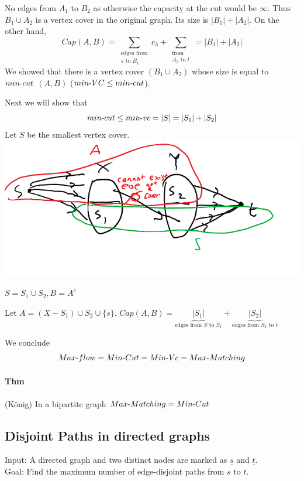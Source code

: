 \documentclass[12 pt]{article}
\begin{document}
        No edges from $A_1$ to $B_2$ as otherwise the capacity at the
        cut would be $\infty$. Thus $B_1 \cup A_2$ is a vertex cover
        in the original graph. Its size is $|B_1|+|A_2|$. On the other
        hand,
        $$Cap(A,B) = \sum_{\substack{\text{edges from} \\ s\text{ to }B_1}} c_3
        + \sum_{\substack{\text{from} \\ A_2\text{ to }t}} = |B_1| + |A_2|$$
        We showed that there is a vertex cover $(B_1 \cup A_2)$ whose
        size is equal to $min\hbox{-}cut$ $(A,B)$ ($min\hbox{-}VC \leq
        min\hbox{-}cut$).

        Next we will show that
        $$min\hbox{-}cut \leq min\hbox{-}vc = |S| = |S_1| + |S_2|$$
        Let $S$ be the smallest vertex cover.
        \\ \includegraphics[width=.9\textwidth]{i65.pdf}

        $S = S_1 \cup S_2, B=A^c$
        
        Let $A=(X-S_1)\cup S_2 \cup \{s\}$. $Cap(A,B)=
        \underbrace{|S_1|}_{\text{edges from $S$ to $S_1$}} +
        \underbrace{|S_2|}_{\text{edges from $S_2$ to $t$}}$

        We conclude $$Max\hbox{-} flow = Min\hbox{-}Cut = Min\hbox{-}Vc = Max\hbox{-}Matching$$

        \paragraph{Thm} (K\"onig) In a bipartite graph $Max\hbox{-}Matching =
        Min\hbox{-}Cut$
        \subsection{Disjoint Paths in directed graphs}
        Input: A directed graph and two distinct nodes are marked as
        $\underline{s}$ and $\underline{t}$.
        \\ Goal: Find the maximum number of edge-disjoint paths from
        $s$ to $t$.
\end{document}

